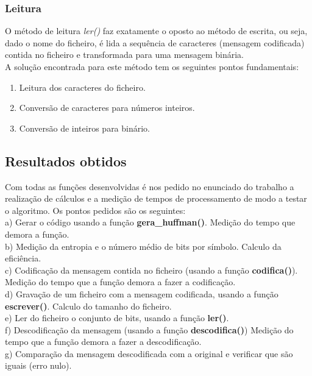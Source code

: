 \documentclass[12pt,a4paper]{article}
\begin{document}
\subsubsection{Leitura}
O método de leitura \textit{ler()} faz exatamente o oposto ao método de escrita, ou seja, dado o nome do ficheiro, é lida a sequência de caracteres (mensagem codificada) contida no ficheiro e transformada para uma mensagem binária.\\ A solução encontrada para este método tem os seguintes pontos fundamentais:
\begin{enumerate}
\item Leitura dos caracteres do ficheiro.
\item Conversão de caracteres para números inteiros.
\item Conversão de inteiros para binário.
\end{enumerate}

\subsection{Resultados obtidos}
Com todas as funções desenvolvidas é nos pedido no enunciado do trabalho a realização de cálculos e a medição de tempos de processamento de modo a testar o algoritmo. Os pontos pedidos são os seguintes:\\
\newline
a) Gerar o código usando a função \textbf{gera\_huffman()}. Medição do tempo que demora a função.\\
\newline
b) Medição da entropia e o número médio de bits por símbolo. Calculo da eficiência.\\
\newline
c) Codificação da mensagem contida no ficheiro (usando a função \textbf{codifica()}). Medição do tempo
que a função demora a fazer a codificação.\\
\newline
d) Gravação de um ficheiro com a mensagem codificada, usando a função \textbf{escrever()}. Calculo do tamanho do ficheiro.\\
\newline
e) Ler do ficheiro o conjunto de bits, usando a função \textbf{ler()}.\\
\newline
f) Descodificação da mensagem (usando a função \textbf{descodifica()}) Medição do tempo que a função
demora a fazer a descodificação.\\
\newline
g) Comparação da mensagem descodificada com a original e verificar que são iguais (erro nulo).\\
\end{document}
